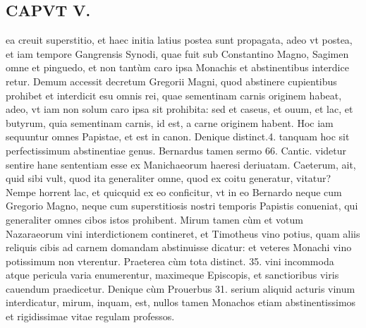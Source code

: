 \documentclass{article}
\begin{document}
\begin{pages}
\section*{CAPVT  V. }
\marginpar{[ p.879 ]}\pstart ea creuit superstitio, et haec initia latius postea sunt propagata, adeo vt postea, et iam tempore Gangrensis Synodi, quae fuit sub Constantino Magno, Sagimen omne et pinguedo, et non tantùm caro ipsa Monachis et abstinentibus interdice retur. Demum accessit decretum Gregorii Magni, quod abstinere cupientibus prohibet et interdicit esu omnis rei, quae sementinam carnis originem habeat, adeo, vt iam non solum caro ipsa sit prohibita: sed et caseus, et ouum, et lac, et butyrum, quia sementinam carnis, id est, a carne originem habent. Hoc iam sequuntur omnes Papistae, et est in canon. Denique distinct.4. tanquam hoc sit perfectissimum abstinentiae genus. Bernardus tamen sermo 66. Cantic. videtur sentire hane sententiam esse ex Manichaeorum haeresi deriuatam. Caeterum, ait, quid sibi vult, quod ita generaliter omne, quod ex coitu generatur, vitatur? Nempe horrent lac, et quicquid ex eo conficitur, vt in eo Bernardo neque cum Gregorio Magno, neque cum superstitiosis nostri temporis Papistis conueniat, qui generaliter omnes cibos istos prohibent. Mirum tamen cùm et votum Nazaraeorum vini interdictionem contineret, et Timotheus vino potius, quam aliis reliquis cibis ad carnem domandam abstinuisse dicatur: et veteres Monachi vino potissimum non vterentur. Praeterea cùm tota distinct. 35. vini incommoda atque pericula varia enumerentur, maximeque Episcopis, et sanctioribus viris cauendum praedicetur. Denique cùm Prouerbus 31. serium aliquid acturis vinum interdicatur, mirum, inquam, est, nullos tamen Monachos etiam abstinentissimos et rigidissimae vitae regulam professos.  \pend

\end{pages}
\end{document}
